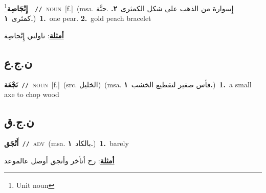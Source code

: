 \documentclass[10pt,a4paper,twoside]{article} %
\begin{document}
\begin{multicols}{2}
{\setlength\topsep{0pt}\textbf{\foreignlanguage{arabic}{إِنْجَاصِة}}\footnote{Unit noun}\ \ {\color{gray}\texttt{//}\color{black}}\ \textsc{noun}\ [f.]\ \color{gray}(msa. \foreignlanguage{arabic}{إِسوارة من الذهب على شكل الكمثرى}~\foreignlanguage{arabic}{\textbf{٢.}}  .\foreignlanguage{arabic}{حبَّة كمثرى}~\foreignlanguage{arabic}{\textbf{١.}})\color{black}\ \textbf{1.}~one pear.  \textbf{2.}~gold peach bracelet\  \begin{flushright}\color{gray}\foreignlanguage{arabic}{\textbf{\underline{\foreignlanguage{arabic}{أمثلة}}}: ناولني إِنْجاصِة}\end{flushright}\color{black}} \vspace{2mm}

\vspace{-3mm}
\subsection*{\color{blue}\foreignlanguage{arabic}{ن.ج.ع}\color{blue}{}} 

{\setlength\topsep{0pt}\textbf{\foreignlanguage{arabic}{نَجْعَة}}\ {\color{gray}\texttt{//}\color{black}}\ \textsc{noun}\ [f.]\ (src. \color{gray}\foreignlanguage{arabic}{الخليل}\color{black})\ \color{gray}(msa. \foreignlanguage{arabic}{فأس صغير لتقطيع الخشب}~\foreignlanguage{arabic}{\textbf{١.}})\color{black}\ \textbf{1.}~a small axe to chop wood\ } \vspace{2mm}

\vspace{-3mm}
\subsection*{\color{blue}\foreignlanguage{arabic}{ن.ج.ق}\color{blue}{ (ntws)}} 

{\setlength\topsep{0pt}\textbf{\foreignlanguage{arabic}{أَنْجَق}}\ {\color{gray}\texttt{//}\color{black}}\ \textsc{adv}\ \color{gray}(msa. \foreignlanguage{arabic}{بالكاد}~\foreignlanguage{arabic}{\textbf{١.}})\color{black}\ \textbf{1.}~barely\  \begin{flushright}\color{gray}\foreignlanguage{arabic}{\textbf{\underline{\foreignlanguage{arabic}{أمثلة}}}: رح أتأخر وأنجق أوصل عالموعد}\end{flushright}\color{black}} \vspace{2mm}


\end{multicols}
\end{document}
